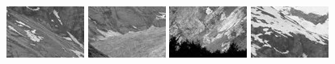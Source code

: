 \documentclass{article}
\begin{document}
\begin{figure}[H]
	\begin{minipage}[b]{0.24\linewidth}
		\centering
		\includegraphics[width=72pt]{../result/patch-96-64-0.png}
	\end{minipage}
	\begin{minipage}[b]{0.24\linewidth}
		\centering
		\includegraphics[width=72pt]{../result/patch-96-64-1.png}
	\end{minipage}
	\begin{minipage}[b]{0.24\linewidth}
		\centering
		\includegraphics[width=72pt]{../result/patch-96-64-2.png}
	\end{minipage}
	\begin{minipage}[b]{0.24\linewidth}
		\centering
		\includegraphics[width=72pt]{../result/patch-96-64-3.png}
	\end{minipage}
\end{figure}
\end{document}
